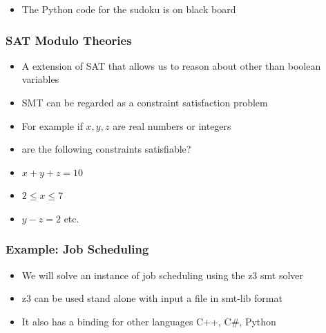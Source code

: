 \documentclass{beamer}
\begin{document}
\begin{frame}
  \begin{itemize}
  \item The Python code for the sudoku is on black board
  \end{itemize}
\end{frame}
\begin{frame}
 \frametitle{SAT Modulo Theories}
 \begin{itemize}
  \item A extension of SAT that allows us to reason about other than boolean variables
  \item SMT can be regarded as a constraint satisfaction problem
  \item For example if $x,y,z$ are real numbers or integers 
  \item are the following constraints satisfiable?
  \item $x+y+z=10$
  \item $2\le x\le 7$
  \item $y-z=2$ etc.
   
 \end{itemize} 
\end{frame}

\begin{frame}
  \frametitle{Example: Job Scheduling}
  \begin{itemize}
  \item We will solve an instance of job scheduling using the z3 smt solver
  \item z3 can be used stand alone with input a file in smt-lib format
  \item It also has a binding for other languages C++, C\#, Python
  \end{itemize}
\end{frame}
\end{document}
